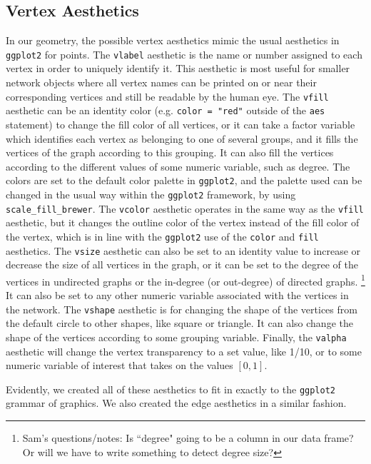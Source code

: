 \documentclass[11pt]{article}\usepackage[]{graphicx}\usepackage[]{color}
\begin{document}
  \subsection{Vertex Aesthetics}
  In our geometry, the possible vertex aesthetics mimic the usual aesthetics in \texttt{ggplot2} for points.  The \texttt{vlabel} aesthetic is the name or number assigned to each vertex in order to uniquely identify it.  This aesthetic is most useful for smaller network objects where all vertex names can be printed on or near their corresponding vertices and still be readable by the human eye.  The \texttt{vfill} aesthetic can be an identity color (e.g. \texttt{color = "red"} outside of the \texttt{aes} statement) to change the fill color of all vertices, or it can take a factor variable which identifies each vertex as belonging to one of several groups, and it fills the vertices of the graph according to this grouping.  It can also fill the vertices according to the different values of  some numeric variable, such as degree.  The colors are set to the default color palette in \texttt{ggplot2}, and the palette used can be changed in the usual way within the \texttt{ggplot2} framework, by using \texttt{scale\_fill\_brewer}.  The \texttt{vcolor} aesthetic operates in the same way as the \texttt{vfill} aesthetic, but it changes the outline color of the vertex instead of the fill color of the vertex, which is in line with the \texttt{ggplot2} use of the \texttt{color} and \texttt{fill} aesthetics.  The \texttt{vsize} aesthetic can also be set to an identity value to increase or decrease the size of all vertices in the graph, or it can be set to the degree of the vertices in undirected graphs or the in-degree (or out-degree) of directed graphs.  \footnote{Sam's questions/notes: Is ``degree" going to be a column in our data frame? Or will we have to write something to detect degree size?} It can also be set to any other numeric variable associated with the vertices in the network.  The \texttt{vshape} aesthetic is for changing the shape of the vertices from the default circle to other shapes, like square or triangle.  It can also change the shape of the vertices according to some grouping variable.  Finally, the \texttt{valpha} aesthetic will change the vertex transparency to a set value, like 1/10, or to some numeric variable of interest that takes on the values $[0,1]$.  
  
\par Evidently, we created all of these aesthetics to fit in exactly to the \texttt{ggplot2} grammar of graphics. We also created the edge aesthetics in a similar fashion. 
\end{document}
